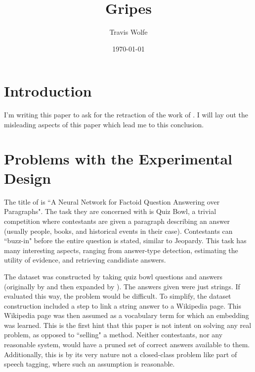\documentclass[12pt]{article}
\title{Gripes}
\author{Travis Wolfe}
\date{\today}
\begin{document}
\maketitle

\section{Introduction}
% 

I'm writing this paper to ask for the retraction of the work of
.
I will lay out the misleading aspects of this paper which lead me
to this conclusion.



\section{Problems with the Experimental Design}
The title of  is
``A Neural Network for Factoid Question Answering over Paragraphs".
The task they are concerned with is Quiz Bowl, a trivial competition
where contestants are given a paragraph describing an answer (usually
people, books, and historical events in their case). Contestants can
``buzz-in" before the entire question is stated, similar to Jeopardy.
This task has many interesting aspects, ranging from answer-type detection,
estimating the utility of evidence, and retrieving candidiate answers.

The dataset was constructed
by taking quiz bowl questions and answers
(originally by 
and then expanded by ).
The answers given were just strings.
If evaluated this way, the problem would be difficult.
To simplify, the dataset construction included a step to link
a string answer to a Wikipedia page.
This Wikipedia page was then assumed as a vocabulary term for which
an embedding was learned.
This is the first hint that this paper is not intent on solving any
real problem, as opposed to ``selling" a method.
Neither contestants, nor any reasonable system, would have a pruned
set of correct answers available to them.
Additionally, this is by its very nature not a closed-class problem
like part of speech tagging, where such an assumption is reasonable.
\end{document}
